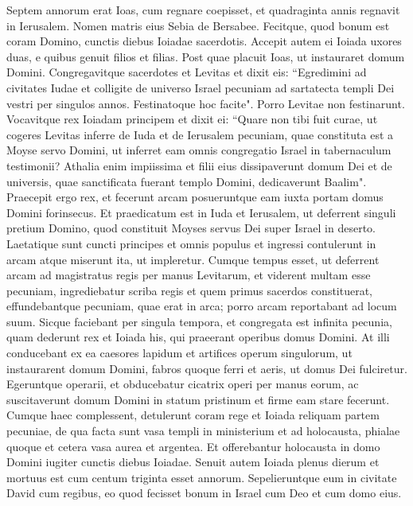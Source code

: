 \begin{biblechapter}  
\verse Septem annorum erat Ioas, cum regnare coepisset, et quadraginta annis regnavit in Ierusalem. Nomen matris eius Sebia de Bersabee. 
\verse Fecitque, quod bonum est coram Domino, cunctis diebus Ioiadae sacerdotis. 
\verse Accepit autem ei Ioiada uxores duas, e quibus genuit filios et filias. 
\verse Post quae placuit Ioas, ut instauraret domum Domini. 
\verse Congregavitque sacerdotes et Levitas et dixit eis: “Egredimini ad civitates Iudae et colligite de universo Israel pecuniam ad sartatecta templi Dei vestri per singulos annos. Festinatoque hoc facite". Porro Levitae non festinarunt. 
\verse Vocavitque rex Ioiadam principem et dixit ei: “Quare non tibi fuit curae, ut cogeres Levitas inferre de Iuda et de Ierusalem pecuniam, quae constituta est a Moyse servo Domini, ut inferret eam omnis congregatio Israel in tabernaculum testimonii?  
\verse Athalia enim impiissima et filii eius dissipaverunt domum Dei et de universis, quae sanctificata fuerant templo Domini, dedicaverunt Baalim". 
\verse Praecepit ergo rex, et fecerunt arcam posueruntque eam iuxta portam domus Domini forinsecus. 
\verse Et praedicatum est in Iuda et Ierusalem, ut deferrent singuli pretium Domino, quod constituit Moyses servus Dei super Israel in deserto. 
\verse Laetatique sunt cuncti principes et omnis populus et ingressi contulerunt in arcam atque miserunt ita, ut impleretur. 
\verse Cumque tempus esset, ut deferrent arcam ad magistratus regis per manus Levitarum, et viderent multam esse pecuniam, ingrediebatur scriba regis et quem primus sacerdos constituerat, effundebantque pecuniam, quae erat in arca; porro arcam reportabant ad locum suum. Sicque faciebant per singula tempora, et congregata est infinita pecunia, 
\verse quam dederunt rex et Ioiada his, qui praeerant operibus domus Domini. At illi conducebant ex ea caesores lapidum et artifices operum singulorum, ut instaurarent domum Domini, fabros quoque ferri et aeris, ut domus Dei fulciretur. 
\verse Egeruntque operarii, et obducebatur cicatrix operi per manus eorum, ac suscitaverunt domum Domini in statum pristinum et firme eam stare fecerunt. 
\verse Cumque haec complessent, detulerunt coram rege et Ioiada reliquam partem pecuniae, de qua facta sunt vasa templi in ministerium et ad holocausta, phialae quoque et cetera vasa aurea et argentea. Et offerebantur holocausta in domo Domini iugiter cunctis diebus Ioiadae. 
\verse Senuit autem Ioiada plenus dierum et mortuus est cum centum triginta esset annorum. 
\verse Sepelieruntque eum in civitate David cum regibus, eo quod fecisset bonum in Israel cum Deo et cum domo eius. 

\end{biblechapter}
